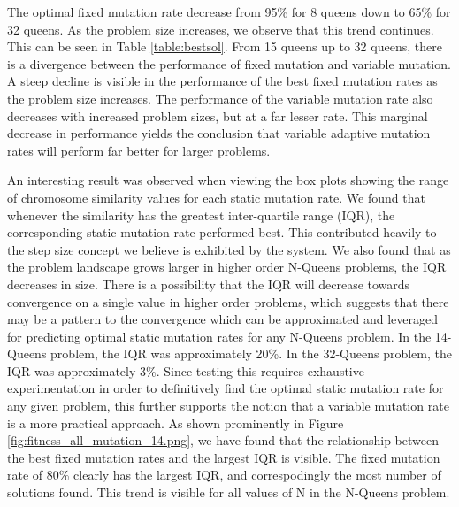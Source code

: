 \documentclass{sig-alternate}
\begin{document}
The optimal fixed mutation rate decrease from 95\% for 8 queens down to 65\% for 32 queens. As the problem size increases, we observe that this trend continues. This can be seen in Table \ref{table:bestsol}. From 15 queens up to 32 queens, there is a divergence between the performance of fixed mutation and variable mutation. A steep decline is visible in the performance of the best fixed mutation rates as the problem size increases. The performance of the variable mutation rate also decreases with increased problem sizes, but at a far lesser rate. This marginal decrease in performance yields the conclusion that variable adaptive mutation rates will perform far better for larger problems.

An interesting result was observed when viewing the box plots showing the range of chromosome similarity values for each static mutation rate. We found that whenever the similarity has the greatest inter-quartile range (IQR), the corresponding static mutation rate performed best. This contributed heavily to the step size concept we believe is exhibited by the system. We also found that as the problem landscape grows larger in higher order N-Queens problems, the IQR decreases in size. There is a possibility that the IQR will decrease towards convergence on a single value in higher order problems, which suggests that there may be a pattern to the convergence which can be approximated and leveraged for predicting optimal static mutation rates for any N-Queens problem. In the 14-Queens problem, the IQR was approximately 20\%. In the 32-Queens problem, the IQR was approximately 3\%. Since testing this requires exhaustive experimentation in order to definitively find the optimal static mutation rate for any given problem, this further supports the notion that a variable mutation rate is a more practical approach. As shown prominently in Figure \ref{fig:fitness_all_mutation_14.png}, we have found that the relationship between the best fixed mutation rates and the largest IQR is visible. The fixed mutation rate of 80\% clearly has the largest IQR, and correspodingly the most number of solutions found. This trend is visible for all values of N in the N-Queens problem. 
\end{document}
